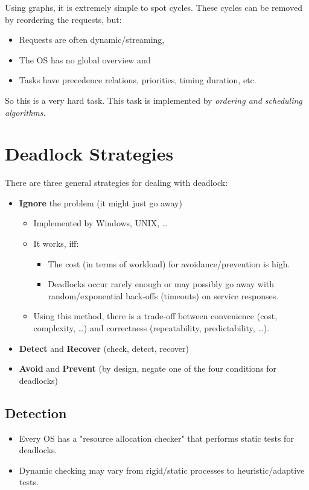 \documentclass[a4paper, 11pt, accentcolor = tud3b]{tudreport}
\begin{document}
	        Using graphs, it is extremely simple to spot cycles. These cycles can be removed by reordering the requests, but:
	        \begin{itemize}
	        	\item Requests are often dynamic/streaming,
	        	\item The OS has no global overview and
	        	\item Tasks have precedence relations, priorities, timing duration, etc.
	        \end{itemize}
	        So this is a very hard task. This task is implemented by \textit{ordering and scheduling algorithms}.

        \section{Deadlock Strategies}
            There are three general strategies for dealing with deadlock:
            \begin{itemize}
            	\item \textbf{Ignore} the problem (it might just go away)
	            	\begin{itemize}
	            		\item Implemented by Windows, UNIX, \dots
	            		\item It works, iff:
		            		\begin{itemize}
		            			\item The cost (in terms of workload) for avoidance/prevention is high.
		            			\item Deadlocks occur rarely enough or may possibly go away with random/exponential back-offs (timeouts) on service responses.
		            		\end{itemize}
	            		\item Using this method, there is a trade-off between convenience (cost, complexity, \dots) and correctness (repeatability, predictability, \dots).
	            	\end{itemize}
            	\item \textbf{Detect} and \textbf{Recover} (check, detect, recover)
            	\item \textbf{Avoid} and \textbf{Prevent} (by design, negate one of the four conditions for deadlocks)
            \end{itemize}

            \subsection{Detection}
                \begin{itemize}
                	\item Every OS has a "resource allocation checker" that performs static tests for deadlocks.
                	\item Dynamic checking may vary from rigid/static processes to heuristic/adaptive tests.
                \end{itemize}
\end{document}
